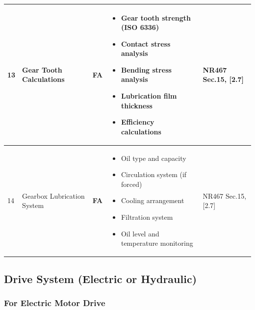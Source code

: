 \documentclass[11pt,a4paper]{report}
\newcommand{\fa}{\textbf{\textcolor{warningred}{FA}}}
\begin{document}
\begin{longtable}{|p{0.5cm}|p{5cm}|p{1.5cm}|p{5.5cm}|p{2cm}|}
13 & Gear Tooth Calculations & \fa{} & 
\begin{itemize}[leftmargin=*,nosep]
\item Gear tooth strength (ISO 6336)
\item Contact stress analysis
\item Bending stress analysis
\item Lubrication film thickness
\item Efficiency calculations
\end{itemize} & NR467 Sec.15, [2.7] \\
\hline

14 & Gearbox Lubrication System & \fa{} & 
\begin{itemize}[leftmargin=*,nosep]
\item Oil type and capacity
\item Circulation system (if forced)
\item Cooling arrangement
\item Filtration system
\item Oil level and temperature monitoring
\end{itemize} & NR467 Sec.15, [2.7] \\
\hline

\end{longtable}

\subsection{Drive System (Electric or Hydraulic)}

\subsubsection{For Electric Motor Drive}
\end{document}
